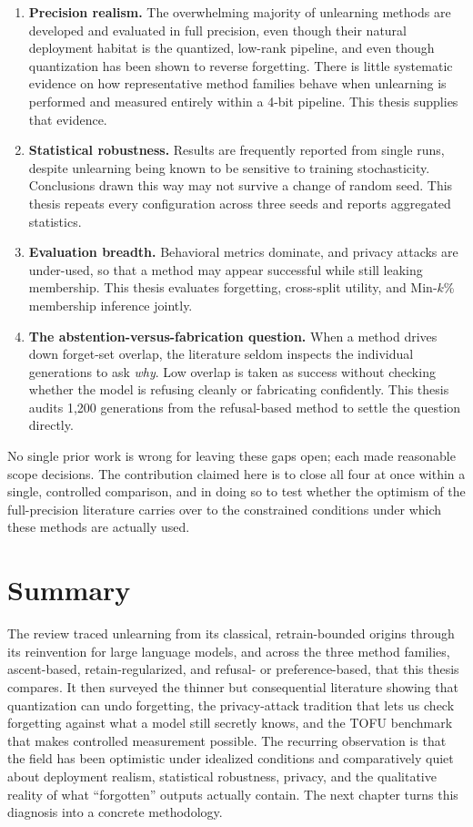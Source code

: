 \documentclass[a4paper,12pt]{report}
\begin{document}
\begin{enumerate}
	\item \textbf{Precision realism.} The overwhelming majority of unlearning methods are developed and evaluated in full precision, even though their natural deployment habitat is the quantized, low-rank pipeline, and even though quantization has been shown to reverse forgetting. There is little systematic evidence on how representative method families behave when unlearning is performed and measured entirely within a 4-bit pipeline. This thesis supplies that evidence.
	\item \textbf{Statistical robustness.} Results are frequently reported from single runs, despite unlearning being known to be sensitive to training stochasticity. Conclusions drawn this way may not survive a change of random seed. This thesis repeats every configuration across three seeds and reports aggregated statistics.
	\item \textbf{Evaluation breadth.} Behavioral metrics dominate, and privacy attacks are under-used, so that a method may appear successful while still leaking membership. This thesis evaluates forgetting, cross-split utility, and Min-$k$\% membership inference jointly.
	\item \textbf{The abstention-versus-fabrication question.} When a method drives down forget-set overlap, the literature seldom inspects the individual generations to ask \emph{why}. Low overlap is taken as success without checking whether the model is refusing cleanly or fabricating confidently. This thesis audits 1{,}200 generations from the refusal-based method to settle the question directly.
\end{enumerate}

No single prior work is wrong for leaving these gaps open; each made reasonable scope decisions. The contribution claimed here is to close all four at once within a single, controlled comparison, and in doing so to test whether the optimism of the full-precision literature carries over to the constrained conditions under which these methods are actually used.

\section{Summary}
The review traced unlearning from its classical, retrain-bounded origins through its reinvention for large language models, and across the three method families, ascent-based, retain-regularized, and refusal- or preference-based, that this thesis compares. It then surveyed the thinner but consequential literature showing that quantization can undo forgetting, the privacy-attack tradition that lets us check forgetting against what a model still secretly knows, and the TOFU benchmark that makes controlled measurement possible. The recurring observation is that the field has been optimistic under idealized conditions and comparatively quiet about deployment realism, statistical robustness, privacy, and the qualitative reality of what ``forgotten'' outputs actually contain. The next chapter turns this diagnosis into a concrete methodology.
\end{document}
